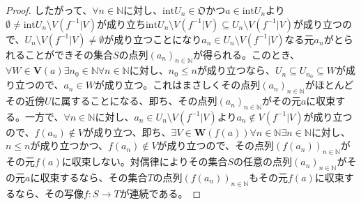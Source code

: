 \documentclass[dvipdfmx]{jsarticle}
\begin{document}
\begin{proof}
したがって、$\forall n \in \mathbb{N}$に対し、${\mathrm{int}}U_{n}\in \mathfrak{O}$かつ$a \in {\mathrm{int}}U_{n}$より$\emptyset \neq {\mathrm{int}}U_{n} \setminus V\left( f^{- 1}|V \right)$が成り立ち${\mathrm{int}}U_{n} \setminus V\left( f^{- 1}|V \right) \subseteq U_{n} \setminus V\left( f^{- 1}|V \right)$が成り立つので、$U_{n} \setminus V\left( f^{- 1}|V \right) \neq \emptyset$が成り立つことになり$a_{n} \in U_{n} \setminus V\left( f^{- 1}|V \right)$なる元$a_{n}$がとられることができその集合$S$の点列$\left( a_{n} \right)_{n \in \mathbb{N}}$が得られる。このとき、$\forall W \in \mathbf{V}(a)\exists n_{0} \in \mathbb{N}\forall n \in \mathbb{N}$に対し、$n_{0} \leq n$が成り立つなら、$U_{n} \subseteq U_{n_{0}} \subseteq W$が成り立つので、$a_{n} \in W$が成り立つ。これはまさしくその点列$\left( a_{n} \right)_{n \in \mathbb{N}}$がほとんどその近傍$U$に属することになる、即ち、その点列$\left( a_{n} \right)_{n \in \mathbb{N}}$がその元$a$に収束する。一方で、$\forall n \in \mathbb{N}$に対し、$a_{n} \in U_{n} \setminus V\left( f^{- 1}|V \right)$より$a_{n} \notin V\left( f^{- 1}|V \right)$が成り立つので、$f\left( a_{n} \right) \notin V$が成り立つ、即ち、$\exists V \in \mathbf{W}\left( f(a) \right)\forall n \in \mathbb{N}\exists n \in \mathbb{N}$に対し、$n \leq n$が成り立つかつ、$f\left( a_{n} \right) \notin V$が成り立つので、その点列$\left( f\left( a_{n} \right) \right)_{n \in \mathbb{N}}$がその元$f(a)$に収束しない。対偶律によりその集合$S$の任意の点列$\left( a_{n} \right)_{n \in \mathbb{N}}$がその元$a$に収束するなら、その集合$T$の点列$\left( f\left( a_{n} \right) \right)_{n \in \mathbb{N}}$もその元$f(a)$に収束するなら、その写像$f:S \rightarrow T$が連続である。
\end{proof}
\end{document}
